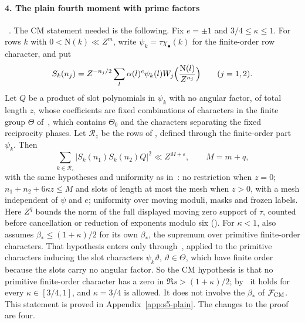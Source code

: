 \documentclass[11pt]{article}
\numberwithin{equation}{section}
\newcommand{\N}{\mathrm N}
\begin{document}
\paragraph{4. The plain fourth moment with prime factors}~\cite[Lemma~18.1]{OAI78}.
The CM statement needed is the following. Fix $e=\pm1$ and $3/4\le\kappa\le1$. For rows $k$ with
$0<\N(k)\ll Z^m$, write $\psi_k=\tau\chi_\bullet(k)$ for the finite-order row character, and put
\begin{equation}\label{eq:d083}
 S_k(n_j)=Z^{-n_j/2}\sum_l\alpha(l)^e\psi_k(l)W_j\Bigl(\frac{\N(l)}{Z^{n_j}}\Bigr)\qquad(j=1,2).
\end{equation}
Let $Q$ be a product of slot polynomials in $\psi_k$ with no angular factor, of total length $z$, whose
coefficients are fixed combinations of characters in the finite group $\Theta$
of~\cite[Section~18]{OAI78}, which contains $\Theta_0$ and the characters separating the fixed
reciprocity phases. Let $\mathcal R_z$ be the rows of
\cite{OAI78}, defined through the finite-order part $\psi_k$. Then
\begin{equation}\label{eq:d084}
 \sum_{k\in\mathcal R_z}|S_k(n_1)S_k(n_2)Q|^2\ll Z^{M+\varepsilon},\qquad M=m+q,
\end{equation}
with the same hypotheses and uniformity as in~\cite{OAI78}: no restriction when $z=0$;
$n_1+n_2+6\kappa z\le M$ and slots of length at most the mesh when $z>0$, with a mesh independent of $\psi$ and
$e$; uniformity over moving moduli, masks and frozen labels. Here $Z^q$ bounds the norm of the full displayed
moving zero support of $\tau$, counted before cancellation or reduction of exponents modulo six
(\cite[Sections~13.1 and~18]{OAI78}). For $\kappa<1$, \cite{OAI78} also assumes $\beta_*\le(1+\kappa)/2$ for
its own $\beta_*$, the supremum over primitive finite-order characters. That hypothesis enters only
through~\cite[eq.~(18.11)]{OAI78}, applied to the primitive characters inducing the slot characters
$\psi_k\vartheta$, $\vartheta\in\Theta$, which have finite order because the slots carry no angular factor. So the CM
hypothesis is that no primitive finite-order character has a zero in $\Re s>(1+\kappa)/2$;
by~\cite[Theorem~1.1]{OAI78} it holds for every $\kappa\in[3/4,1]$, and $\kappa=3/4$ is allowed. It does not
involve the $\beta_*$ of $\mathcal F_{\rm CM}$. This statement is proved in Appendix~\ref{app:s5-plain}.
The changes to the proof are four.
\end{document}
